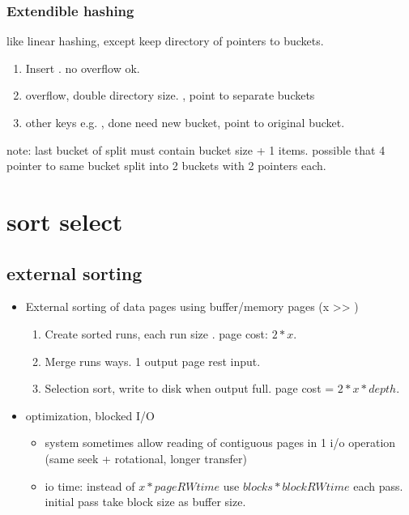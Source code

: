 \documentclass{article}
\begin{document}
\begin{multicols*}{4}
\subsubsection{Extendible hashing}
like linear hashing, except keep directory of pointers to buckets.
\begin{enumerate}
  \item Insert . no overflow ok.
  \item overflow, double directory size. ,  point to separate buckets
  \item other keys e.g. ,  done need new bucket, point to original  bucket.
\end{enumerate}
note: last bucket of split must contain bucket size + 1 items. possible that 4 pointer to same bucket split into 2 buckets with 2 pointers each.

\section{sort select}
\subsection{external sorting}
\begin{itemize}
  \item External sorting of  data pages using  buffer/memory pages (x >> )
  \begin{enumerate}
    \item Create sorted runs, each run size . page cost: $2 * x$.
    \item Merge runs  ways. 1 output page rest input. 
    \item Selection sort, write to disk when output full. page cost = $2 * x * depth$.
  \end{enumerate}
  
  \item optimization, blocked I/O
  \begin{itemize}
    \item system sometimes allow reading of  contiguous pages in 1 i/o operation (same seek + rotational, longer transfer)
    \item io time: instead of $x * pageRWtime$ use $blocks * blockRWtime$ each pass. initial pass take block size as buffer size.
  \end{itemize}
\end{itemize}


\end{multicols*}
\end{document}
